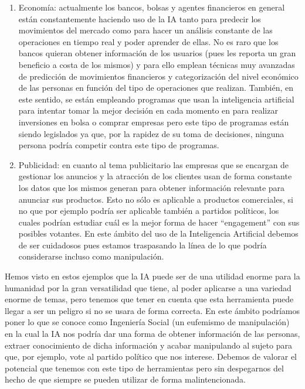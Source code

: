 \begin{enumerate}
  \item Economía: actualmente los bancos, bolsas y agentes financieros en general están constantemente haciendo uso de la IA tanto para predecir los movimientos del mercado como para hacer un análisis constante de las operaciones en tiempo real y poder aprender de ellas. No es raro que los bancos quieran obtener información de los usuarios (pues les reporta un gran beneficio a costa de los mismos) y para ello emplean técnicas muy avanzadas de predicción de movimientos financieros y categorización del nivel económico de las personas en función del tipo de operaciones que realizan. También, en este sentido, se están empleando programas que usan la inteligencia artificial para intentar tomar la mejor decisión en cada momento en para realizar inversiones en bolsa o comprar empresas pero este tipo de programas están siendo legislados ya que, por la rapidez de su toma de decisiones, ninguna persona podría competir contra este tipo de programas.
  \item Publicidad: en cuanto al tema publicitario las empresas que se encargan de gestionar los anuncios y la atracción de los clientes usan de forma constante los datos que los mismos generan para obtener información relevante para anunciar sus productos. Esto no sólo es aplicable a productos comerciales, si no que por ejemplo podría ser aplicable también a partidos políticos, los cuales podrían estudiar cuál es la mejor forma de hacer ``engagement'' con sus posibles votantes. En este ámbito del uso de la Inteligencia Artificial debemos de ser cuidadosos pues estamos traspasando la línea de lo que podría considerarse incluso como manipulación.
\end{enumerate}

Hemos visto en estos ejemplos que la IA puede ser de una utilidad enorme para la humanidad por la gran versatilidad que tiene, al poder aplicarse a una variedad enorme de temas, pero tenemos que tener en cuenta que esta herramienta puede llegar a ser un peligro si no se usara de forma correcta. En este ámbito podríamos poner lo que se conoce como Ingeniería Social (un eufemismo de manipulación) en la cual la IA nos podría dar una forma de obtener información de las personas, extraer conocimiento de dicha información y acabar manipulando al sujeto para que, por ejemplo, vote al partido político que nos interese. Debemos de valorar el potencial que tenemos con este tipo de herramientas pero sin despegarnos del hecho de que siempre se pueden utilizar de forma malintencionada.

